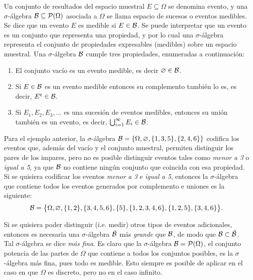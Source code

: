 Un conjunto de resultados del espacio muestral \(E \subseteq \Omega\) se denomina evento, y una \(\sigma\)-álgebra \(\mathcal{B} \subseteq \mathcal{P}(\Omega)\) asociada a \(\Omega\) se llama espacio de sucesos o eventos medibles. Se dice que un evento \(E\) es medible si \(E \in \mathcal{B}\). Se puede interpretar que un evento es un conjunto que representa una propiedad, y por lo cual una \(\sigma\)-álgebra representa el conjunto de propiedades expresables (medibles) sobre un espacio muestral. Una \(\sigma\)-álgebra \(\mathcal{B}\) cumple tres propiedades, enumeradas a continuación:
\begin{enumerate}
	\item El conjunto vacío es un evento medible, es decir \(\varnothing \in \mathcal{B}\).
	\item Si \(E \in \mathcal{B}\) es un evento medible entonces su complemento también lo es, es decir, \(E^\mathsf{c} \in \mathcal{B}\).
	\item Si \(E_1, E_2, E_3, \dotsc\) es una sucesión de eventos medibles, entonces su unión también es un evento, es decir, \(\bigcup_{i=1}^\infty E_i \in \mathcal{B}\).
\end{enumerate}

Para el ejemplo anterior, la \(\sigma\)-álgebra \(\mathcal{B} = \{\Omega, \varnothing, \{1, 3, 5\}, \{2, 4, 6\}\}\) codifica los eventos que, además del vacío y el conjunto muestral, permiten distinguir los pares de los impares, pero no es posible distinguir eventos tales como \emph{menor a 3} o \emph{igual a 5}, ya que \(\mathcal{B}\) no contiene ningún conjunto que coincida con esa propiedad. Si se quisiera codificar los eventos \emph{menor a 3} e \emph{igual a 5}, entonces la \(\sigma\)-álgebra que contiene todos los eventos generados por complemento e uniones es la siguiente: \[\mathcal{B} = \big\{\Omega, \varnothing, \{1, 2\}, \{3, 4, 5, 6\}, \{5\}, \{1, 2, 3, 4, 6\}, \{1, 2, 5\}, \{3, 4, 6\}\big\}.\]

Si se quisiera poder distinguir (i.e. medir) otros tipos de eventos adicionales, entonces es necesaria una \(\sigma\)-álgebra \(\hat{\mathcal{B}}\) más \emph{grande} que \(\mathcal{B}\), de modo que \(\mathcal{B} \subset \hat{\mathcal{B}}\). Tal \(\sigma\)-álgebra se dice \emph{más fina}. Es claro que la \(\sigma\)-álgebra \(\mathcal{B} = \mathcal{P}(\Omega)\), el conjunto potencia de las partes de \(\Omega\) que contiene a todos los conjuntos posibles, es la \(\sigma\)-álgebra más fina, pues todo es medible. Esto siempre es posible de aplicar en el caso en que \(\Omega\) es discreto, pero no en el caso infinito.

